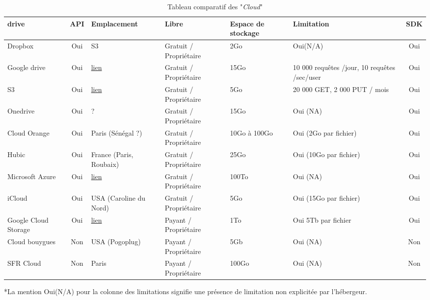 \documentclass[10pt]{article}
\begin{document}
\begin{table}[!h] \caption{Tableau comparatif des "\textit{Cloud}"}
\renewcommand{\arraystretch}{1.5} \begin{center}
\begin{tabular}{|m{1in}|c|m{1in}|m{1in}|m{1in}|m{1in}|c|} \hline \bf\centering
drive & \bf API & \bf Emplacement & \bf Libre & \bf\centering Espace de
stockage & \bf Limitation & \bf SDK\\ \hline \centering Dropbox & Oui & S3 &
Gratuit / Propriétaire & 2Go & Oui(N/A) & Oui \\ \hline \centering Google drive
& Oui  &
\href{http://www.google.com/about/datacenters/inside/locations/index.html}{lien}
& Gratuit / Propriétaire & 15Go & 10 000 requêtes /jour, 10 requêtes /sec/user
& Oui \\ \hline \centering S3 & Oui  &
\href{http://aws.amazon.com/fr/about-aws/global-infrastructure/}{lien} &
Gratuit / Propriétaire & 5Go & 20 000 GET, 2 000 PUT / mois & Oui \\ \hline
\centering Onedrive & Oui  & ? & Gratuit / Propriétaire & 15Go & Oui (NA) & Oui
\\ \hline \centering Cloud Orange & Oui  & Paris (Sénégal ?) & Gratuit /
Propriétaire & 10Go à 100Go & Oui (2Go par fichier) & Oui \\ \hline \centering
Hubic & Oui  & France (Paris, Roubaix) & Gratuit / Propriétaire & 25Go & Oui
(10Go par fichier) & Oui \\ \hline \centering Microsoft Azure & Oui  &
\href{http://azure.microsoft.com/en-us/regions/}{lien} & Gratuit / Propriétaire
& 100To & Oui (NA) & Oui \\ \hline \centering iCloud & Oui  & USA (Caroline du
Nord) & Gratuit / Propriétaire & 5Go & Oui (15Go par fichier) & Oui \\ \hline
\centering Google Cloud Storage & Oui  &
\href{http://www.google.com/about/datacenters/inside/locations/index.html}{lien}
& Payant  / Propriétaire & 1To & Oui 5Tb par fichier & Oui \\ \hline \centering
Cloud bouygues & Non  & USA (Pogoplug) & Payant  / Propriétaire & 5Gb & Oui
(NA) & Non \\ \hline \centering SFR Cloud & Non & Paris & Payant / Propriétaire
& 100Go & Oui (NA) & Non \\ \hline \end{tabular} \end{center} \end{table} *La
mention Oui(N/A) pour la colonne des limitations signifie une présence de
limitation non explicitée par l'hébergeur.\\
\end{document}
